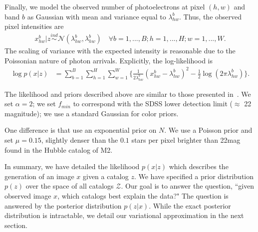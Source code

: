 Finally, we model the observed number of photoelectrons at pixel $(h,w)$ and band $b$ as Gaussian
with mean and variance equal to $\lambda^b_{hw}$. 
Thus, the observed pixel intensities are
\begin{align}
  x_{hw}^b | z \overset{ind}{\sim} \mathcal{N}(\lambda^b_{hw}, \lambda^b_{hw})
  \quad\forall b = 1, ..., B; h = 1,..., H; w = 1, ..., W. 
\end{align}
The scaling of variance with the expected intensity is reasonable due to the Poissonian nature of photon arrivals. 
Explicitly, the log-likelihood is
\begin{align}
    \log p(x | z) &= \sum_{b = 1}^{B} \sum_{h = 1}^H \sum_{w = 1}^W 
        \Big\{\frac{1}{2\lambda^b_{hw}}(x_{hw}^b  - \lambda^b_{hw})^2 - 
               \frac{1}{2}\log(2\pi\lambda^b_{hw})\Big\}
    \label{eq:loglik}.
\end{align}

The likelihood and priors described above are similar to those
presented in~\cite{Portillo_2017, Feder_2019}. We set $\alpha = 2$; we set 
$f_{min}$ to correspond with the SDSS 
lower detection limit ($\approx$ 22 magnitude); we use a standard Gaussian for color priors. 

One difference is that \cite{Portillo_2017, Feder_2019} use an exponential prior on $N$. We use a Poisson prior and set $\mu = 0.15$, slightly denser than the $0.1$ stars per pixel 
brighter than 22mag found in the Hubble catalog of M2. 

In summary, we have detailed the likelihood
$p(x | z)$ which describes the generation of an image $x$ given a catalog $z$. We have specified a prior distribution $p(z)$ over the space 
of all catalogs $\mathcal{Z}$. 
Our goal is to answer the question, ``given observed image $x$, which 
catalogs best explain the data?"
The question is answered by the posterior distribution $p(z | x)$. While 
the exact posterior distribution is intractable, we detail our variational approximation in the next section. 